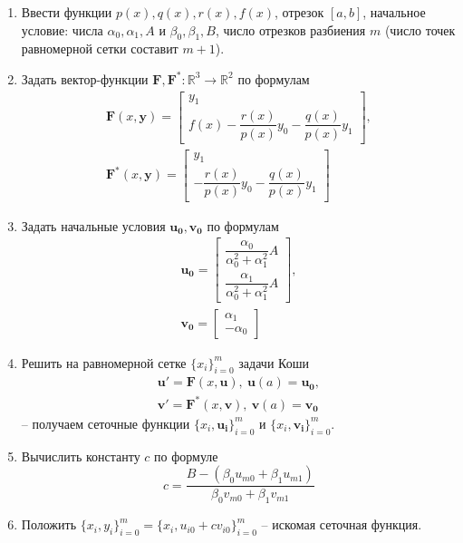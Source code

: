 \documentclass[a4paper, 12pt]{article}
\begin{document}
	\begin{enumerate}
		\item Ввести функции $p(x),q(x),r(x),f(x)$, отрезок $[a,b]$, начальное условие: числа $\alpha_0, \alpha_1, A$ и $\beta_0, \beta_1, B$, число отрезков разбиения $m$ (число точек равномерной сетки составит $m+1$).
		\item Задать вектор-функции $\mathbf{F}, \mathbf{F^*}:\mathbb{R}^3\rightarrow\mathbb{R}^2$ по формулам
		\begin{equation}
			\begin{gathered}
				\mathbf{F}(x, \mathbf{y}) =
				\begin{bmatrix}
					y_1\\
					f(x)-\dfrac{r(x)}{p(x)}y_0-\dfrac{q(x)}{p(x)}y_1
				\end{bmatrix},\\
				\mathbf{F^*}(x, \mathbf{y}) =
				\begin{bmatrix}
					y_1\\
					-\dfrac{r(x)}{p(x)}y_0-\dfrac{q(x)}{p(x)}y_1
				\end{bmatrix}
			\end{gathered}
		\end{equation}
		\item Задать начальные условия $\mathbf{u_0}, \mathbf{v_0}$ по формулам
		\begin{equation}
			\begin{gathered}
				\mathbf{u_0} =
				\begin{bmatrix}
					\dfrac{\alpha_0}{\alpha_0^2+\alpha_1^2}A\\
					\dfrac{\alpha_1}{\alpha_0^2+\alpha_1^2}A
				\end{bmatrix},\\
				\mathbf{v_0} =
				\begin{bmatrix}
					\alpha_1\\
					-\alpha_0
				\end{bmatrix}
			\end{gathered}
		\end{equation}
		\item Решить на равномерной сетке $\{x_i\}_{i=0}^m$ задачи Коши
		\begin{equation}
			\begin{gathered}
				\mathbf{u'}=\mathbf{F}(x,\mathbf{u}), \ \mathbf{u}(a)=\mathbf{u_0},\\
				\mathbf{v'}=\mathbf{F^*}(x,\mathbf{v}), \ \mathbf{v}(a)=\mathbf{v_0}
			\end{gathered}
		\end{equation}
		-- получаем сеточные функции $\{x_i,\mathbf{u_i}\}_{i=0}^m$ и $\{x_i,\mathbf{v_i}\}_{i=0}^m$.
		\item Вычислить константу $c$ по формуле
		\begin{equation} \label{const}
			c=\dfrac{B-(\beta_0u_{m0}+\beta_1u_{m1})}{\beta_0v_{m0}+\beta_1v_{m1}}
		\end{equation}
		\item Положить $\{x_i,y_i\}_{i=0}^m = \{x_i,u_{i0}+cv_{i0}\}_{i=0}^m$ -- искомая сеточная функция.
	\end{enumerate}
		
\end{document}

